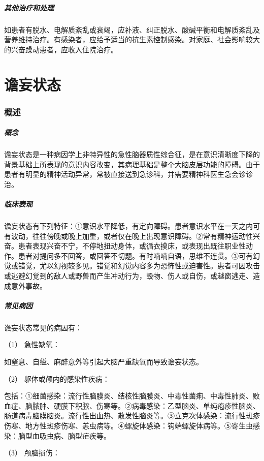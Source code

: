 \subparagraph{其他治疗和处理}

如患者有脱水、电解质紊乱或衰竭，应补液、纠正脱水、酸碱平衡和电解质紊乱及营养维持治疗。有感染者，应给予适当的抗生素控制感染。对家庭、社会影响较大的兴奋躁动患者，应收入住院治疗。

\protect\hypertarget{text00044.html}{}{}

\section{谵妄状态}

\subsubsection{概述}

\subparagraph{概念}

谵妄状态是一种病因学上非特异性的急性脑器质性综合征，是在意识清晰度下降的背景基础上所表现的意识内容改变，其病理基础是整个大脑皮层功能的障碍。由于患者有明显的精神活动异常，常被直接送到急诊科，并需要精神科医生急会诊诊治。

\subparagraph{临床表现}

谵妄状态有下列特征：①意识水平降低，有定向障碍。患者意识水平在一天之内可有波动，往往傍晚或晚上加重，或者仅在晚上出现意识障碍。②常有精神运动性兴奋。患者表现兴奋不宁，不停地扭动身体，或循衣摸床，或表现出既往职业性动作。患者对提问多不回答，或回答不切题。有时喃喃自语，思维不连贯。③可有幻觉或错觉，尤以幻视较多见。错觉和幻觉内容多为恐怖性或迫害性。患者可因攻击或逃避幻觉到的敌人或野兽而产生冲动行为，毁物、伤人或自伤，或越窗逃走、造成意外事故。

\subparagraph{常见病因}

谵妄状态常见的病因有：

\hypertarget{text00044.htmlux5cux23CHP1-18-2-1-3-1}{}
（1） 急性缺氧：

如窒息、自缢、麻醉意外等引起大脑严重缺氧而导致谵妄状态。

\hypertarget{text00044.htmlux5cux23CHP1-18-2-1-3-2}{}
（2） 躯体或颅内的感染性疾病：

包括：①细菌感染：流行性脑膜炎、结核性脑膜炎、中毒性菌痢、中毒性肺炎、败血症、脑脓肿、硬膜下积脓、伤寒等。②病毒感染：乙型脑炎、单纯疱疹性脑炎、肠道病毒脑膜脑炎。流行性出血热、散发性脑炎等。③立克次体感染：流行性斑疹伤寒、地方性斑疹伤寒、恙虫病等。④螺旋体感染：钩端螺旋体病等。⑤寄生虫感染：脑型血吸虫病、脑型疟疾等。

\hypertarget{text00044.htmlux5cux23CHP1-18-2-1-3-3}{}
（3） 颅脑损伤：

